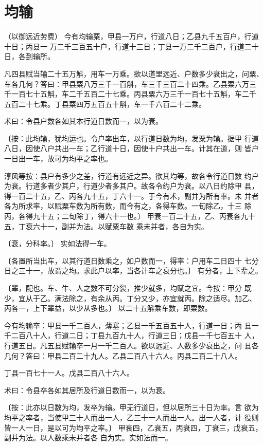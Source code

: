 \documentclass[a4paper,12pt,UTF8,twoside]{ctexbook}
\begin{document}
\chapter{均输}
（以御远近劳费） 今有均输粟，甲县一万户，行道八日；乙县九千五百户，行道十日；丙县一 万二千三百五十户，行道十三日；丁县一万二千二百户，行道二十日，各到输所。

凡四县赋当输二十五万斛，用车一万乘。欲以道里远近、户数多少衰出之，问粟、 车各几何？答曰：甲县粟八万三千一百斛，车三千三百二十四乘。乙县粟六万三 千一百七十五斛，车二千五百二十七乘。丙县粟六万三千一百七十五斛，车二千 五百二十七乘。丁县粟四万五百五十斛，车一千六百二十二乘。

术曰：令县户数各如其本行道日数而一，以为衰。

〔按：此均输，犹均运也。令户率出车，以行道日数为均，发粟为输。据甲 行道八日，因使八户共出一车；乙行道十日，因使十户共出一车。计其在道，则 皆户一日出一车，故可为均平之率也。

淳风等按：县户有多少之差，行道有远近之异。欲其均等，故各令行道日数 约户为衰。行道多者少其户，行道少者多其户。故各令约户为衰。以八日约除甲 县，得一百二十五，乙、丙各九十五，丁六十一。于今有术，副并为所有率。未 并者各为所求率，以赋粟车数为所有数，而今有之，各得车数。一旬除乙，十三 除丙，各得九十五；二旬除丁，得六十一也。〕 甲衰一百二十五，乙、丙衰各九十五，丁衰六十一，副并为法。以赋粟车数 乘未并者，各自为实。

〔衰，分科率。〕 实如法得一车。

〔各置所当出车，以其行道日数乘之，如户数而一，得率：户用车二日四十 七分日之三十一，故谓之均。求此户以率，当各计车之衰分也。〕 有分者，上下辈之。

〔辈，配也。车、牛、人之数不可分裂，推少就多，均赋之宜。今按：甲分 既少，宜从于乙。满法除之，有余从丙。丁分又少，亦宜就丙。除之适尽。加乙、 丙各一，上下辈益，以少从多也。〕 以二十五斛乘车数，即粟数。

今有均输卒：甲县一千二百人，薄塞；乙县一千五百五十人，行道一日；丙 县一千二百八十人，行道二日；丁县九百九十人，行道三日；戊县一千七百五十 人，行道五日。凡五县赋输卒一月一千二百人。欲以远近、人数多少衰出之，问 县各几何？答曰：甲县二百二十九人。乙县二百八十六人。丙县二百二十八人。

丁县一百七十一人。戊县二百八十六人。

术曰：令县卒各如其居所及行道日数而一，以为衰。

〔按：此亦以日数为均，发卒为输。甲无行道日，但以居所三十日为率。言 欲为均平之率者，当使甲三十人而出一人，乙三十一人而出一人。出一人者，计 役则皆一人一日，是以可为均平之率。〕 甲衰四，乙衰五，丙衰四，丁衰三，戊衰五，副并为法。以人数乘未并者各 自为实。实如法而一。
\end{document}
